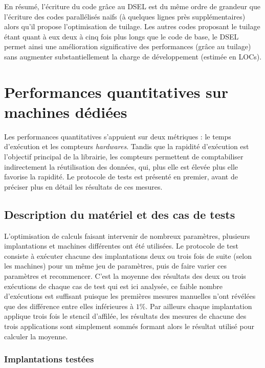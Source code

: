 En résumé, l'écriture du code grâce au DSEL est du même ordre de grandeur que l'écriture des codes parallélisés naïfs (à quelques lignes près supplémentaires) alors qu'il propose l'optimisation de tuilage. Les autres codes proposant le tuilage étant quant à eux deux à cinq fois plus longs que le code de base, le DSEL permet ainsi une amélioration significative des performances (grâce au tuilage) sans augmenter substantiellement la charge de développement (estimée en LOCs).


\section{Performances quantitatives sur machines dédiées}

Les performances quantitatives s'appuient sur deux métriques : le temps d'exécution et les compteurs \emph{hardwares}. Tandis que la rapidité d'exécution est l'objectif principal de la librairie, les compteurs permettent de comptabiliser indirectement la réutilisation des données, qui, plus elle est élevée plus elle favorise la rapidité. Le protocole de tests est présenté en premier, avant de préciser plus en détail les résultats de ces mesures.

\subsection{Description du matériel et des cas de tests}
\label{sec:desc_mat_tests}

L'optimisation de calculs faisant intervenir de nombreux paramètres, plusieurs implantations et machines différentes ont été utilisées. Le protocole de test consiste à exécuter chacune des implantations deux ou trois fois de suite (selon les machines) pour un même jeu de paramètres, puis de faire varier ces paramètres et recommencer. C'est la moyenne des résultats des deux ou trois exécutions de chaque cas de test qui est ici analysée, ce faible nombre d'exécutions est suffisant puisque les premières mesures manuelles n'ont révélées que des différence entre elles inférieures à $1\%$. Par ailleurs chaque implantation applique trois fois le stencil d'affilée, les résultats des mesures de chacune des trois applications sont simplement sommés formant alors le résultat utilisé pour calculer la moyenne.

\subsubsection*{Implantations testées}

